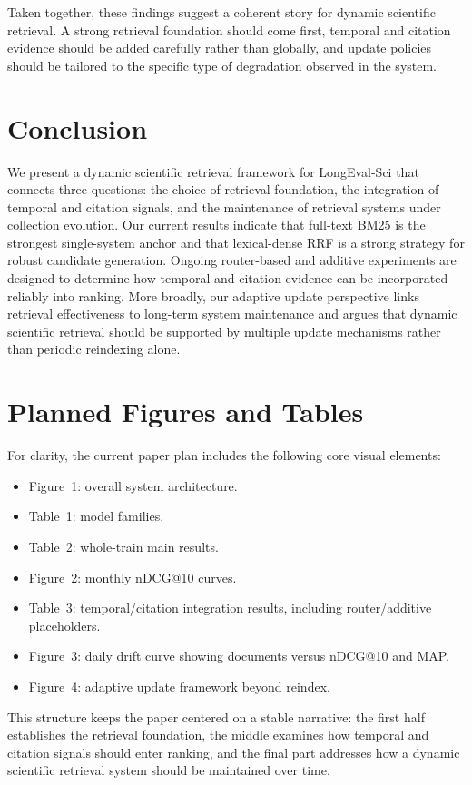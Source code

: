 \documentclass[11pt]{article}
\begin{document}
Taken together, these findings suggest a coherent story for dynamic scientific retrieval. A strong retrieval foundation should come first, temporal and citation evidence should be added carefully rather than globally, and update policies should be tailored to the specific type of degradation observed in the system.

\section{Conclusion}

We present a dynamic scientific retrieval framework for LongEval-Sci that connects three questions: the choice of retrieval foundation, the integration of temporal and citation signals, and the maintenance of retrieval systems under collection evolution. Our current results indicate that full-text BM25 is the strongest single-system anchor and that lexical-dense RRF is a strong strategy for robust candidate generation. Ongoing router-based and additive experiments are designed to determine how temporal and citation evidence can be incorporated reliably into ranking. More broadly, our adaptive update perspective links retrieval effectiveness to long-term system maintenance and argues that dynamic scientific retrieval should be supported by multiple update mechanisms rather than periodic reindexing alone.

\section*{Planned Figures and Tables}

For clarity, the current paper plan includes the following core visual elements:
\begin{itemize}[leftmargin=1.5em]
    \item Figure~1: overall system architecture.
    \item Table~1: model families.
    \item Table~2: whole-train main results.
    \item Figure~2: monthly nDCG@10 curves.
    \item Table~3: temporal/citation integration results, including router/additive placeholders.
    \item Figure~3: daily drift curve showing documents versus nDCG@10 and MAP.
    \item Figure~4: adaptive update framework beyond reindex.
\end{itemize}

This structure keeps the paper centered on a stable narrative: the first half establishes the retrieval foundation, the middle examines how temporal and citation signals should enter ranking, and the final part addresses how a dynamic scientific retrieval system should be maintained over time.



\end{document}
